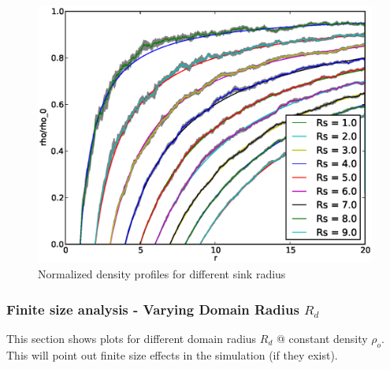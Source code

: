 \begin{figure}[H]
    \centering
    \includegraphics[width = .7 \textwidth]{plots/np/rs/rho_over_rho0.eps} 
    \caption{Normalized density profiles for different sink radius}
    \label{fig:ror0Rs}
\end{figure}
\subsubsection{Finite size analysis - Varying Domain Radius $R_d$}
This section shows plots for different domain radius $R_d$ @ constant density $\rho_o$.
This will point out finite size effects in the simulation (if they exist). 

